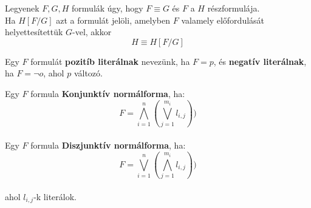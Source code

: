\documentclass{beamer}
\begin{document}
\begin{frame}

\begin{tcolorbox}[title={Lemma: Helyettesítési Lemma}]
Legyenek $F, G, H$ formulák úgy, hogy $F \equiv G$ és $F$ a $H$ részformulája.\\
Ha $H[F/G]$ azt a formulát jelöli, amelyben $F$ valamely előfordulását helyettesítettük $G$-vel, akkor
$$H \equiv H[F/G]$$
\end{tcolorbox}

\end{frame}

\begin{frame}

\begin{tcolorbox}[title={Def.: Literál}]
Egy $F$ formulát \textbf{pozitíb literálnak} nevezünk, ha $F = p$, és \textbf{negatív literálnak}, ha $F = {\neg}o$, ahol $p$ változó.
\end{tcolorbox}

\begin{tcolorbox}[title={Def.: Konjunktív, diszjunktív normálforma}]
Egy $F$ formula \textbf{Konjunktív normálforma}, ha:\\
$$F = \bigwedge_{i = 1}^n (\bigvee_{j = 1}^{m_i} l_{i, j}))$$\\
Egy $F$ formula \textbf{Diszjunktív normálforma}, ha:\\
$$F = \bigvee_{i = 1}^n (\bigwedge_{j = 1}^{m_i} l_{i, j}))$$\\
ahol $l_{i, j}$-k literálok.
\end{tcolorbox}

\end{frame}
\end{document}
